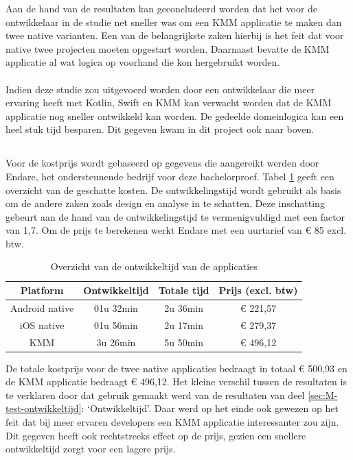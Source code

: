 Aan de hand van de resultaten kan geconcludeerd worden dat het voor de ontwikkelaar in de studie net sneller was om een KMM applicatie te maken dan twee native varianten. Een van de belangrijkste zaken hierbij is het feit dat voor native twee projecten moeten opgestart worden. Daarnaast bevatte de KMM applicatie al wat logica op voorhand die kon hergebruikt worden.
\\ \\ 
Indien deze studie zou uitgevoerd worden door een ontwikkelaar die meer ervaring heeft met Kotlin, Swift en KMM kan verwacht worden dat de KMM applicatie nog sneller ontwikkeld kan worden. De gedeelde domeinlogica kan een heel stuk tijd besparen. Dit gegeven kwam in dit project ook naar boven.

\subsection{}
\label{sec:M-test-lijnen-kostprijs}
Voor de kostprijs wordt gebaseerd op gegevens die aangereikt werden door Endare, het ondersteunende bedrijf voor deze bachelorproef. Tabel \ref{T:prijzen-overzicht} geeft een overzicht van de geschatte kosten. De ontwikkelingstijd wordt gebruikt als basis om de andere zaken zoals design en analyse in te schatten. Deze inschatting gebeurt aan de hand van de ontwikkelingstijd te vermenigvuldigd met een factor van 1,7. Om de prijs te berekenen werkt Endare met een uurtarief van \euro{} 85 excl. btw.

\begin{table}[H]
    \centering
    \caption{Overzicht van de ontwikkeltijd van de applicaties}
    \begin{tabular}{|c|c|c|c|}
        \hline
        {\textbf{Platform}} & {\textbf{Ontwikkeltijd}}& {\textbf{Totale tijd}}& {\textbf{Prijs (excl. btw)}}\\ \hline \hline
        Android native&01u 32min&2u 36min&\euro{} 221,57\\ \hline
        iOS native&01u 56min&2u 17min&\euro{} 279,37\\ \hline
        KMM&3u 26min&5u 50min&\euro{} 496,12\\ \hline
    \end{tabular}
    \label{T:prijzen-overzicht}
\end{table}

De totale kostprijs voor de twee native applicaties bedraagt in totaal \euro{} 500,93 en de KMM applicatie bedraagt \euro{} 496,12. Het kleine verschil tussen de resultaten is te verklaren door dat gebruik gemaakt werd van de resultaten van deel \ref{sec:M-test-ontwikkeltijd}: `Ontwikkeltijd'. Daar werd op het einde ook gewezen op het feit dat bij meer ervaren developers een KMM applicatie interessanter zou zijn. Dit gegeven heeft ook rechtstreeks effect op de prijs, gezien een snellere ontwikkeltijd zorgt voor een lagere prijs.

